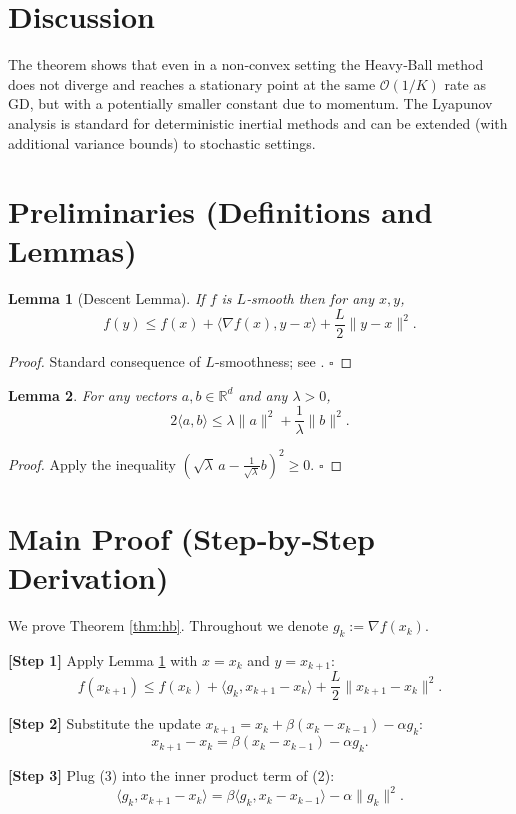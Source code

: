 \documentclass{article}
\newtheorem{lemma}{Lemma}
\begin{document}
\section*{Discussion}
The theorem shows that even in a non‑convex setting the Heavy‑Ball method does not diverge and reaches a stationary point at the same $\mathcal{O}(1/K)$ rate as GD, but with a potentially smaller constant due to momentum. The Lyapunov analysis is standard for deterministic inertial methods and can be extended (with additional variance bounds) to stochastic settings.

\newpage
\section*{Preliminaries (Definitions and Lemmas)}
\begin{lemma}[Descent Lemma]\label{lem:descent}
If $f$ is $L$‑smooth then for any $x,y$,
\[
f(y)\le f(x)+\langle\nabla f(x),y-x\rangle+\frac{L}{2}\|y-x\|^2 .
\]
\end{lemma}
\begin{proof}
Standard consequence of $L$‑smoothness; see \cite{nesterov2004introductory}. \hfill $\square$
\end{proof}

\begin{lemma}\label{lem:quadratic}
For any vectors $a,b\in\mathbb{R}^d$ and any $\lambda>0$,
\[
2\langle a,b\rangle\le \lambda\|a\|^2+\frac{1}{\lambda}\|b\|^2 .
\]
\end{lemma}
\begin{proof}
Apply the inequality $(\sqrt{\lambda}\,a-\frac{1}{\sqrt{\lambda}}b)^2\ge0$. \hfill $\square$
\end{proof}

\section*{Main Proof (Step‑by‑Step Derivation)}
We prove Theorem \ref{thm:hb}. Throughout we denote $g_k:=\nabla f(x_k)$.

\noindent\textbf{[Step 1]}  Apply Lemma \ref{lem:descent} with $x=x_k$ and $y=x_{k+1}$:
\[
f(x_{k+1})\le f(x_k)+\langle g_k, x_{k+1}-x_k\rangle+\frac{L}{2}\|x_{k+1}-x_k\|^2 .
\tag{2}
\]

\noindent\textbf{[Step 2]}  Substitute the update $x_{k+1}=x_k+\beta (x_k-x_{k-1})-\alpha g_k$:
\[
x_{k+1}-x_k = \beta (x_k-x_{k-1})-\alpha g_k .
\tag{3}
\]

\noindent\textbf{[Step 3]}  Plug (3) into the inner product term of (2):
\[
\langle g_k, x_{k+1}-x_k\rangle
= \beta\langle g_k, x_k-x_{k-1}\rangle-\alpha\|g_k\|^2 .
\tag{4}
\]
\end{document}
